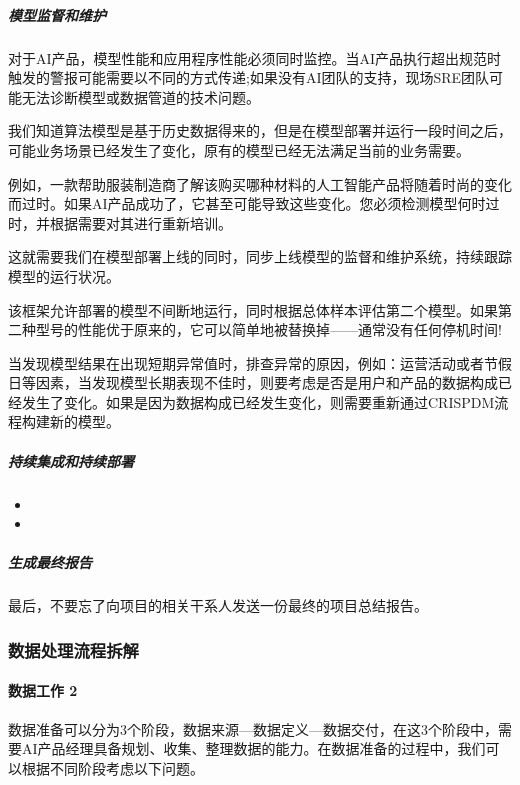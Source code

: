 \documentclass[letterpaper,11pt,english]{sphinxmanual}
\begin{document}
\subparagraph{模型监督和维护}
\label{\detokenize{chapter_project/process:id32}}
对于AI产品，模型性能和应用程序性能必须同时监控。当AI产品执行超出规范时触发的警报可能需要以不同的方式传递;如果没有AI团队的支持，现场SRE团队可能无法诊断模型或数据管道的技术问题。

我们知道算法模型是基于历史数据得来的，但是在模型部署并运行一段时间之后，可能业务场景已经发生了变化，原有的模型已经无法满足当前的业务需要。

例如，一款帮助服装制造商了解该购买哪种材料的人工智能产品将随着时尚的变化而过时。如果AI产品成功了，它甚至可能导致这些变化。您必须检测模型何时过时，并根据需要对其进行重新培训。

这就需要我们在模型部署上线的同时，同步上线模型的监督和维护系统，持续跟踪模型的运行状况。

该框架允许部署的模型不间断地运行，同时根据总体样本评估第二个模型。如果第二种型号的性能优于原来的，它可以简单地被替换掉——通常没有任何停机时间!

当发现模型结果在出现短期异常值时，排查异常的原因，例如：运营活动或者节假日等因素，当发现模型长期表现不佳时，则要考虑是否是用户和产品的数据构成已经发生了变化。如果是因为数据构成已经发生变化，则需要重新通过CRISP\sphinxhyphen{}DM流程构建新的模型。


\subparagraph{持续集成和持续部署}
\label{\detokenize{chapter_project/process:id33}}\begin{itemize}
\item {} 

\item {} 

\end{itemize}


\subparagraph{生成最终报告}
\label{\detokenize{chapter_project/process:id34}}
最后，不要忘了向项目的相关干系人发送一份最终的项目总结报告。


\subsubsection{数据处理流程拆解}
\label{\detokenize{chapter_project/Data Process:id1}}\label{\detokenize{chapter_project/Data Process::doc}}

\paragraph{数据工作 2\sphinxfootnotemark[274]}
\label{\detokenize{chapter_project/Data Process:id2}}%
\begin{footnotetext}[274]\sphinxAtStartFootnote
{}
%
\end{footnotetext}\ignorespaces 
数据准备可以分为3个阶段，数据来源—数据定义—数据交付，在这3个阶段中，需要AI产品经理具备规划、收集、整理数据的能力。在数据准备的过程中，我们可以根据不同阶段考虑以下问题。
\end{document}
